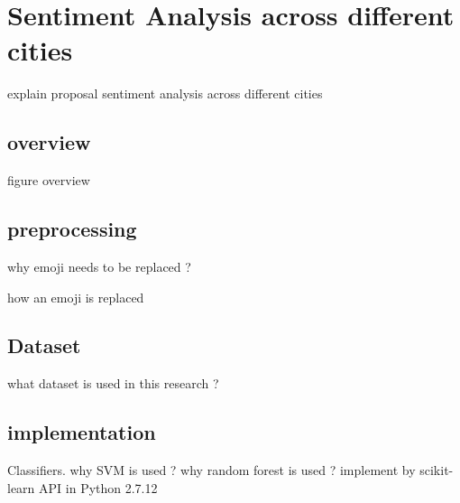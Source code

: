 \chapter{Sentiment Analysis across different cities}
explain proposal sentiment analysis across different cities
\section{overview}
figure overview 

\section{preprocessing }
why emoji needs to be replaced ?
\cite{emoji}

how an emoji is replaced

\section{Dataset}
what dataset is used in this research ?

\section{implementation}
Classifiers. why SVM is used ?
why random forest is used ?
implement by scikit-learn API in Python 2.7.12


